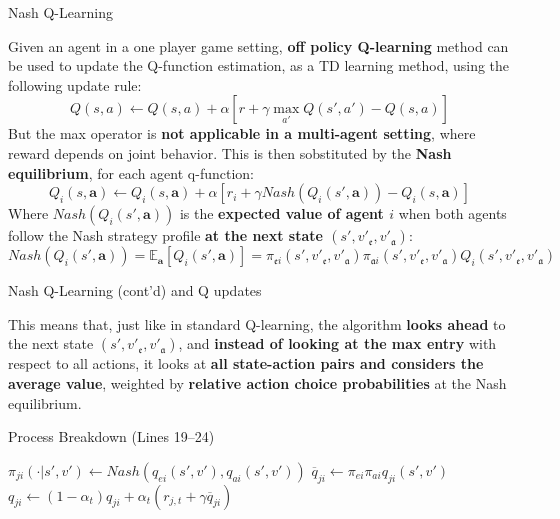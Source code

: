 \documentclass[10pt, aspectratio=169]{beamer}
\newcommand{\evidenzia}[1]{\textcolor{verdeSalvia}{\textbf{#1}}}
\begin{document}
\begin{frame}{Nash Q-Learning}

    Given an agent in a one player game setting, \evidenzia{off policy Q-learning} method can be used to update the Q-function estimation, as a TD learning method, using the following update rule:
    $$Q(s,a) \leftarrow Q(s,a) + \alpha[r + \gamma \max_{a'} Q(s',a') - Q(s,a)]$$
    But the max operator is \evidenzia{not applicable in a multi-agent setting}, where reward depends on joint behavior. This is then sobstituted by the \evidenzia{Nash equilibrium}, for each agent q-function:
    $$Q_i(s,\textbf{a}) \leftarrow Q_i(s,\textbf{a}) + \alpha[r_i + \gamma Nash(Q_i(s',\textbf{a})) - Q_i(s,\textbf{a})]$$    
    Where $Nash(Q_i(s',\textbf{a}))$ is the \evidenzia{expected value of agent $i$} when both agents follow the Nash strategy profile \evidenzia{at the next state $(s',v'_\mathfrak{e}, v'_\mathfrak{a})$}:
    $$Nash(Q_i(s',\textbf{a})) = \mathbb{E}_{\textbf{a}} [Q_i(s',\textbf{a})] = \pi_{\mathfrak{e}i}(s', v'_\mathfrak{e}, v'_\mathfrak{a} )  \pi_{\mathfrak{a}i}(s', v'_\mathfrak{e}, v'_\mathfrak{a} )  Q_i (s', v'_\mathfrak{e}, v'_\mathfrak{a} )$$

\end{frame}

\begin{frame}{Nash Q-Learning (cont'd) and Q updates}

    This means that, just like in standard Q-learning, the algorithm \evidenzia{looks ahead} to the next state $(s',v'_\mathfrak{e}, v'_\mathfrak{a})$, and \evidenzia{instead of looking at the max entry} with respect to all actions, it looks at \evidenzia{all state-action pairs and considers the average value}, weighted by \evidenzia{relative action choice probabilities} at the Nash equilibrium. 
    \vspace{0.5cm}
    
    \begin{block}{Process Breakdown (Lines 19--24)}
    \vspace{0.2cm}
    \begin{algorithmic}
            \STATE $\pi_{ji}(\cdot|s', v') \leftarrow Nash(q_{ei}(s', v'), q_{ai}(s', v'))$ 
            \STATE $\overline{q}_{ji} \leftarrow \pi_{ei} \pi_{ai} q_{ji}(s', v')$
            \STATE $q_{ji} \leftarrow (1-\alpha_t)q_{ji} + \alpha_t(r_{j,t} + \gamma \overline{q}_{ji})$ 
    \end{algorithmic}
    \end{block}
\end{frame}
\end{document}
